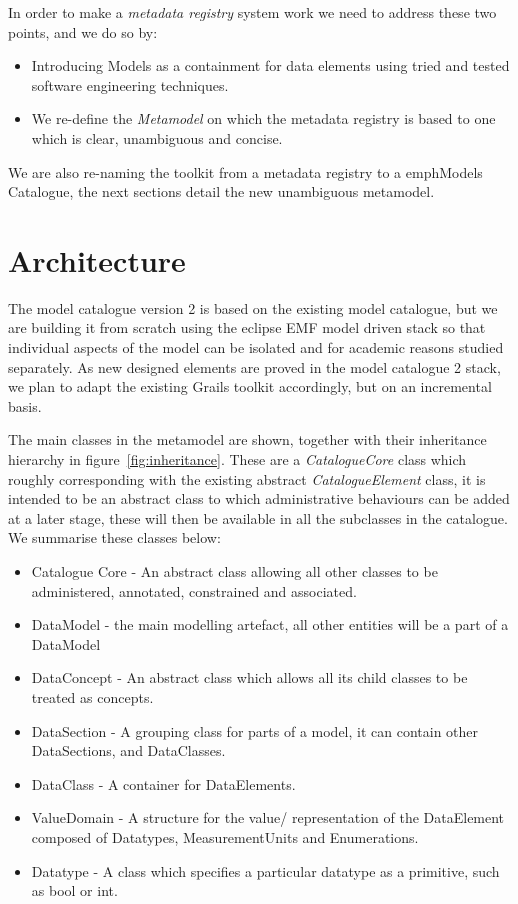 \documentclass{article}
\begin{document}
In order to make a \emph{metadata registry} system work we need to address these two points, and we do so by:
\begin{itemize}
	\item Introducing Models as a containment for data elements using tried and tested software engineering techniques.
	\item We re-define the \emph{Metamodel} on which the metadata registry is based to one which is clear, unambiguous and concise.
\end{itemize}

We are also re-naming the toolkit from a metadata registry to a emph{Models Catalogue}, the next sections detail the new unambiguous metamodel.

 



\section{Architecture}

The model catalogue version 2 is based on the existing model catalogue, but we are building it from scratch using the eclipse EMF model driven stack so that individual aspects of the model can be isolated and for academic reasons studied separately. As new designed elements are proved in the model catalogue 2 stack, we plan to adapt the existing Grails toolkit accordingly, but on an incremental basis.

The main classes in the metamodel are shown, together with their inheritance hierarchy in figure~\ref{fig:inheritance}. These are a \emph{CatalogueCore} class which roughly corresponding with the existing abstract \emph{CatalogueElement} class, it is intended to be an abstract class to which administrative behaviours can be added at a later stage, these will then be available in all the subclasses in the catalogue. We summarise these classes below:
\begin{itemize}
\item Catalogue Core - An abstract class allowing all other classes to be administered, annotated, constrained and associated.
\item DataModel - the main modelling artefact, all other entities will be a part of a DataModel
\item DataConcept - An abstract class which allows all its child classes to be treated as concepts.
\item DataSection - A grouping class for parts of a model, it can contain other DataSections, and DataClasses.
\item DataClass - A container for DataElements.
\item ValueDomain - A structure for the value/ representation of the DataElement composed of Datatypes, MeasurementUnits and Enumerations.
\item Datatype - A class which specifies a particular datatype as a primitive, such as bool or int.
\end{itemize}
\end{document}
